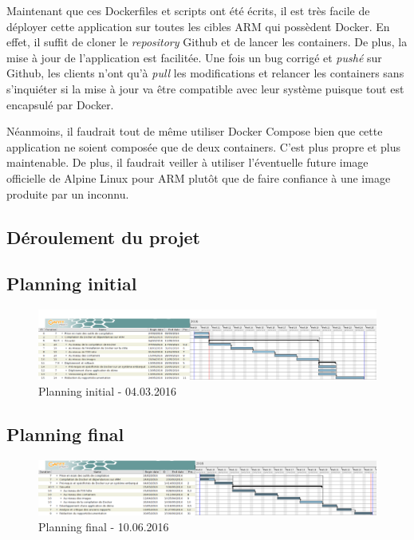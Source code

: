 \documentclass[11pt,a4paper,oneside]{report}
\begin{document}
Maintenant que ces Dockerfiles et scripts ont été écrits, il est très facile de déployer cette application sur toutes les cibles ARM qui possèdent Docker. En effet, il suffit de cloner le \textit{repository} Github et de lancer les containers. De plus, la mise à jour de l'application est facilitée. Une fois un bug corrigé et \textit{pushé} sur Github, les clients n'ont qu'à \textit{pull} les modifications et relancer les containers sans s'inquiéter si la mise à jour va être compatible avec leur système puisque tout est encapsulé par Docker.

Néanmoins, il faudrait tout de même utiliser Docker Compose bien que cette application ne soient composée que de deux containers. C'est plus propre et plus maintenable. De plus, il faudrait veiller à utiliser l'éventuelle future image officielle de Alpine Linux pour ARM plutôt que de faire confiance à une image produite par un inconnu. 

\begin{landscape}
\chapter{Déroulement du projet}


\section{Planning initial}
\begin{figure}[ht]
\centering
\includegraphics[width=24cm]{img/initial_planning.png}
\caption{Planning initial - 04.03.2016}
\end{figure}


\section{Planning final}
\begin{figure}[ht]
\centering
\includegraphics[width=24cm]{img/final_planning.png}
\caption{Planning final - 10.06.2016}
\end{figure}

\end{landscape}
\end{document}
